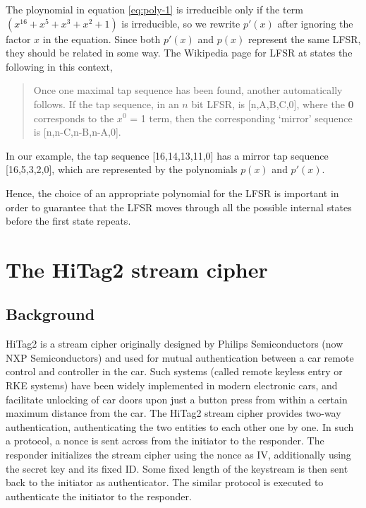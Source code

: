 The ploynomial in equation \ref{eq:poly-1} is irreducible only if the term $(x^{16} + x^{5} + x^{3} + x^{2} + 1)$ is irreducible, so we rewrite $p'(x)$ after ignoring the factor $x$ in the equation. Since both $p'(x)$ and $p(x)$ represent the same LFSR, they should be related in some way. The Wikipedia page for LFSR at \cite{lfsr-wiki} states the following in this context,

\begin{quote}
\footnotesize{
Once one maximal tap sequence has been found, another automatically follows. If the tap sequence, in an $n$ bit LFSR, is [n,A,B,C,0], where the \textbf{0} corresponds to the $x^0$ = 1 term, then the corresponding `mirror' sequence is [n,n-C,n-B,n-A,0].}
\end{quote}

In our example, the tap sequence [16,14,13,11,0] has a mirror tap sequence [16,5,3,2,0], which are represented by the polynomials $p(x)$ and $p'(x)$.

Hence, the choice of an appropriate polynomial for the LFSR is important in order to guarantee that the LFSR moves through all the possible internal states before the first state repeats.

%
%

\section{The HiTag2 stream cipher}
\label{sec:hitag2}

\subsection{Background}
\label{sec:hitag2-background}
HiTag2 is a stream cipher originally designed by Philips Semiconductors (now NXP Semiconductors) and used for mutual authentication between a car remote control and controller in the car. Such systems (called remote keyless entry or RKE systems) have been widely implemented in modern electronic cars, and facilitate unlocking of car doors upon just a button press from within a certain maximum distance from the car. The HiTag2 stream cipher provides two-way authentication, authenticating the two entities to each other one by one. In such a protocol, a nonce is sent across from the initiator to the responder. The responder initializes the stream cipher using the nonce as IV, additionally using the secret key and its fixed ID. Some fixed length of the keystream is then sent back to the initiator as authenticator. The similar protocol is executed to authenticate the initiator to the responder. 

